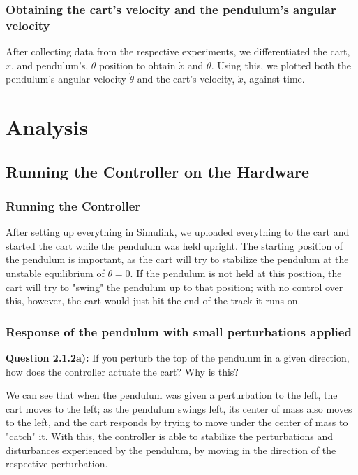 \documentclass[11pt, twoside, letterpaper]{article}   	%
\begin{document}
\subsubsection{Obtaining the cart's velocity and the pendulum's angular velocity}
After collecting data from the respective experiments, we differentiated the cart, $x$, and pendulum's, $\theta$ position to obtain $\dot{x}$ and $\dot{\theta}$.  Using this, we plotted both the pendulum's angular velocity $\dot{\theta}$ and the cart's velocity, $\dot{x}$, against time.

\newpage
\section{Analysis}
\subsection{Running the Controller on the Hardware}
\subsubsection{Running the Controller}
After setting up everything in Simulink, we uploaded everything to the cart and started the cart while the pendulum was held upright. The starting position of the pendulum is important, as the cart will try to stabilize the pendulum at the unstable equilibrium of $\theta=0$. If the pendulum is not held at this position, the cart will try to "swing" the pendulum up to that position; with no control over this, however, the cart would just hit the end of the track it runs on.

\subsubsection{Response of the pendulum with small perturbations applied}
\textbf{Question 2.1.2a):} If you perturb the top of the pendulum in a given direction, how does the controller actuate the cart? Why is this?

We can see that when the pendulum was given a perturbation to the left, the cart moves to the left; as the pendulum swings left, its center of mass also moves to the left, and the cart responds by trying to move under the center of mass to "catch" it.  With this, the controller is able to stabilize the perturbations and disturbances experienced by the pendulum, by moving in the direction of the respective perturbation. \\
\end{document}
